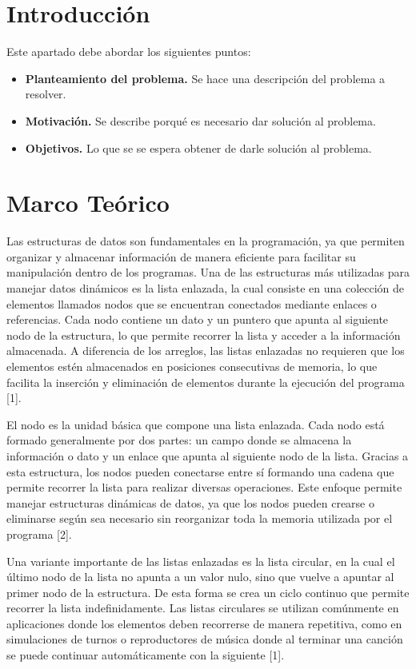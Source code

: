 \documentclass[letterpaper,12pt,oneside]{article}
\begin{document}
\tableofcontents
\clearpage

\section{Introducción}

Este apartado debe abordar los siguientes puntos:

\begin{itemize}
\item \textbf{Planteamiento del problema.} Se hace una descripción del problema a resolver.
\item \textbf{Motivación.} Se describe porqué es necesario dar solución al problema.
\item \textbf{Objetivos.} Lo que se se espera obtener de darle solución al problema.
\end{itemize}

\section{Marco Teórico}

Las estructuras de datos son fundamentales en la programación, ya que permiten organizar y almacenar información de manera eficiente para facilitar su manipulación dentro de los programas. Una de las estructuras más utilizadas para manejar datos dinámicos es la lista enlazada, la cual consiste en una colección de elementos llamados nodos que se encuentran conectados mediante enlaces o referencias. Cada nodo contiene un dato y un puntero que apunta al siguiente nodo de la estructura, lo que permite recorrer la lista y acceder a la información almacenada. A diferencia de los arreglos, las listas enlazadas no requieren que los elementos estén almacenados en posiciones consecutivas de memoria, lo que facilita la inserción y eliminación de elementos durante la ejecución del programa [1].

El nodo es la unidad básica que compone una lista enlazada. Cada nodo está formado generalmente por dos partes: un campo donde se almacena la información o dato y un enlace que apunta al siguiente nodo de la lista. Gracias a esta estructura, los nodos pueden conectarse entre sí formando una cadena que permite recorrer la lista para realizar diversas operaciones. Este enfoque permite manejar estructuras dinámicas de datos, ya que los nodos pueden crearse o eliminarse según sea necesario sin reorganizar toda la memoria utilizada por el programa [2].

Una variante importante de las listas enlazadas es la lista circular, en la cual el último nodo de la lista no apunta a un valor nulo, sino que vuelve a apuntar al primer nodo de la estructura. De esta forma se crea un ciclo continuo que permite recorrer la lista indefinidamente. Las listas circulares se utilizan comúnmente en aplicaciones donde los elementos deben recorrerse de manera repetitiva, como en simulaciones de turnos o reproductores de música donde al terminar una canción se puede continuar automáticamente con la siguiente [1].
\end{document}
